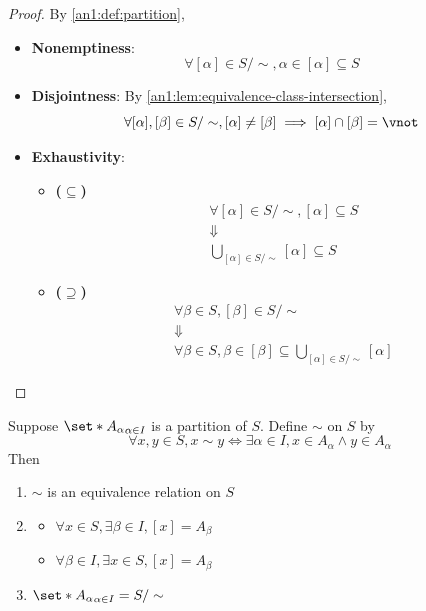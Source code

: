 \begin{proof}
  By \cref{an1:def:partition},
  \begin{itemize}
    \item \textbf{Nonemptiness}:
          \[
            \forall [\alpha] \in S / \sim, \alpha \in [\alpha] \subseteq S
          \]
    \item \textbf{Disjointness}: By \cref{an1:lem:equivalence-class-intersection},
          \[
            \forall [\alpha], [\beta] \in S / \sim, [\alpha] \neq [\beta] \implies [\alpha] \cap [\beta] = \vnot
          \]
    \item \textbf{Exhaustivity}:
          \begin{itemize}
            \item \textbf{($\subseteq$)}
                  \[
                    \begin{array}{c}
                      \forall [\alpha] \in S / \sim, [\alpha] \subseteq S \\
                      \Downarrow                                          \\
                      \bigcup_{[\alpha] \in S / \sim} [\alpha] \subseteq S
                    \end{array}
                  \]
            \item \textbf{($\supseteq$)}
                  \[
                    \begin{array}{c}
                      \forall \beta \in S, [\beta] \in S / \sim \\
                      \Downarrow                                \\
                      \forall\beta \in S, \beta \in [\beta] \subseteq \bigcup_{[\alpha] \in S / \sim} [\alpha]
                    \end{array}
                  \]
          \end{itemize}
  \end{itemize}
\end{proof}

\begin{theorem} \label{an1:thm:partition-defines-equivalence-relation}
  Suppose $\set*{A_{\alpha}}_{\alpha \in I}$ is a partition of $S$. Define $\sim$ on $S$ by
  \[
    \forall x, y \in S, x \sim y \iff \exists \alpha \in I, x \in A_{\alpha} \land y \in A_{\alpha}
  \]
  Then
  \begin{enumerate}[label=\textbf{(\Alph*)}]
    \item $\sim$ is an equivalence relation on $S$
    \item \begin{itemize}
            \item $\forall x \in S, \exists \beta \in I, [x] = A_{\beta}$
            \item $\forall \beta \in I, \exists x \in S, [x] = A_{\beta}$
          \end{itemize}
    \item $\set*{A_{\alpha}}_{\alpha \in I} = S / \sim$
  \end{enumerate}
\end{theorem}

